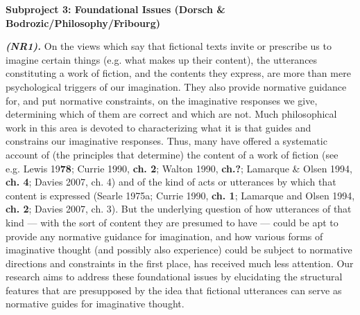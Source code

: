 

\vspace{.2cm}
\noindent\textbf{Subproject 3: Foundational Issues (Dorsch \& Bodrozic/Philosophy/Fribourg)}
\vspace{.2cm}


\vspace{.2cm}
\noindent \textbf{\emph{(NR1).}} On the views which say that fictional texts invite or prescribe us to imagine certain things (e.g. what makes up their content), the utterances constituting a work of fiction, and the contents they express, are more than mere psychological triggers of our imagination. They also provide normative guidance for, and put normative constraints, on the imaginative responses we give, determining which of them are correct and which are not. Much philosophical work in this area is devoted to characterizing what it is that guides and constrains our imaginative responses. Thus, many have offered a systematic account of (the principles that determine) the content of a work of fiction (see e.g. Lewis 19\textbf{78}; Currie 1990, \textbf{ch. 2}; Walton 1990, \textbf{ch.?}; Lamarque \& Olsen 1994, \textbf{ch. 4}; Davies 2007, ch. 4) and of the kind of acts or utterances by which that content is expressed (Searle 1975a; Currie 1990, \textbf{ch. 1}; Lamarque and Olsen 1994, \textbf{ch. 2}; Davies 2007, ch. 3). But the underlying question of how utterances of that kind --- with the sort of content they are presumed to have --- could be apt to provide any normative guidance for imagination, and how various forms of imaginative thought (and possibly also experience) could be subject to normative directions and constraints in the first place, has received much less attention. Our research aims to address these foundational issues by elucidating the structural features that are presupposed by the idea that fictional utterances can serve as normative guides for imaginative thought.

